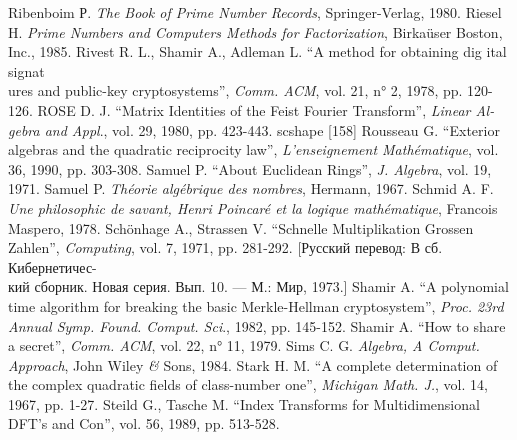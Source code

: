 \documentclass{mai_book}
\begin{document}
\newpage
{}
\noindent
[154] Ribenboim Р. {\itshape The Book of Prime Number Records}, Springer-Verlag, 1980.
\newline
[155] Riesel H. {\itshape Prime Numbers and Computers Methods for Factorization}, Birka\"{u}ser Boston, Inc., 1985.
\newline
[156] Rivest R. L., Shamir A., Adleman L. “A method for obtaining dig­ ital signat\\ures and public-key cryptosystems”, {\itshape Comm. ACM}, vol. 21, n° 2, 1978, pp. 120-126.
\newline
[157] ROSE D. J. “Matrix Identities of the Feist Fourier Transform”, {\itshape Linear Al­ gebra and Appl}., vol. 29, 1980, pp. 423-443.
\newline
{scshape [158] Rousseau G. “Exterior algebras and the quadratic reciprocity law”, {\itshape L’enseignement Math\'{e}matique}, vol. 36, 1990, pp. 303-308.
\newline
[159] Samuel P. “About Euclidean Rings”, {\itshape J. Algebra}, vol. 19, 1971.
\newline
[160] Samuel P. {\itshape Th\'{e}orie alg\'{e}brique des nombres}, Hermann, 1967.
\newline
[161] Schmid A. F. {\itshape Une philosophic de savant, Henri Poincar\'{e} et la logique math\'{e}matique}, Francois Maspero, 1978.
\newline
[162] Sch\"{o}nhage A., Strassen V. “Schnelle Multiplikation Grossen Zahlen”, {\itshape Computing}, vol. 7, 1971, pp. 281-292. [Русский перевод: В сб. Кибернетичес- \\кий сборник. Новая серия. Вып. 10. — М.: Мир, 1973.]
\newline
[163] Shamir A. “A polynomial time algorithm for breaking the basic Merkle-Hellman cryptosystem”, {\itshape Proc. 23rd Annual Symp. Found. Comput. Sci}., 1982, pp. 145-152.
\newline
[164] Shamir A. “How to share a secret”, {\itshape Comm. ACM}, vol. 22, n° 11, 1979.
\newline
[165] Sims C. G. {\itshape Algebra, A Comput. Approach}, John Wiley {\textit \&} Sons, 1984.
\newline
[166] Stark H. M. “A complete determination of the complex quadratic fields of class-number one”, {\itshape Michigan Math. J.}, vol. 14, 1967, pp. 1-27.
\newline
[167] Steild G., Tasche M. “Index Transforms for Multidimensional DFT’s and Con”, vol. 56, 1989, pp. 513-528.
}
\end{document}
